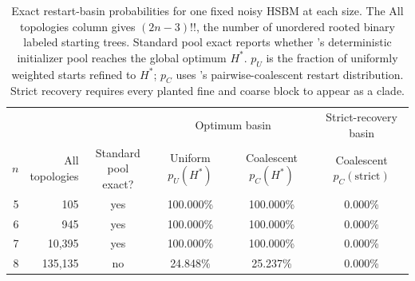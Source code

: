 \begin{table}[H]
\centering
\caption{Exact restart-basin probabilities for one fixed noisy HSBM at each
size. The All topologies column gives $(2n-3)!!$, the number of unordered
rooted binary labeled starting trees. Standard pool exact reports whether \NEST's
deterministic initializer pool reaches the global optimum $H^*$. $p_U$ is the
fraction of uniformly weighted starts refined to $H^*$; $p_C$ uses \NEST's
pairwise-coalescent restart distribution. Strict recovery requires every
planted fine and coarse block to appear as a clade.}
\label{tab:basin-exact}
\small
\begin{tabular*}{\textwidth}{@{\extracolsep{\fill}}rrcccc@{}}
\toprule
& & & \multicolumn{2}{c}{Optimum basin}
& \shortstack{Strict-recovery\\basin} \\
\cmidrule(lr){4-5}
$n$ & \shortstack{All\\topologies}
& \shortstack{Standard pool\\exact?}
& \shortstack{Uniform\\$p_U(H^*)$}
& \shortstack{Coalescent\\$p_C(H^*)$}
& \shortstack{Coalescent\\$p_C(\mathrm{strict})$} \\
\midrule
5 & 105     & yes & 100.000\% & 100.000\% & 0.000\% \\
6 & 945     & yes & 100.000\% & 100.000\% & 0.000\% \\
7 & 10,395  & yes & 100.000\% & 100.000\% & 0.000\% \\
8 & 135,135 & no  &  24.848\% &  25.237\% & 0.000\% \\
\bottomrule
\end{tabular*}
\end{table}
